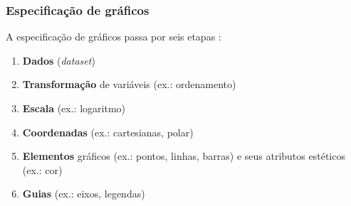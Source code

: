 \begin{frame}
\frametitle{Especificação de gráficos}

A especificação de gráficos passa por seis etapas \cite{wilkinson2005grammar}:
\begin{enumerate}
\item \textbf{Dados} (\emph{dataset})
\item \textbf{Transformação} de variáveis (ex.: ordenamento)
\item \textbf{Escala} (ex.: logaritmo)
\item \textbf{Coordenadas} (ex.: cartesianas, polar)
\item \textbf{Elementos} gráficos (ex.: pontos, linhas, barras) e seus atributos estéticos (ex.: cor)
\item \textbf{Guias} (ex.: eixos, legendas)
\end{enumerate}

\end{frame}

